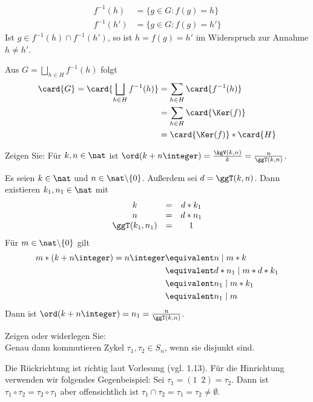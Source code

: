 \begin{uebungsblatt}
\begin{loesung}
\begin{itemize}
		\begin{align*}
			f^{-1}(h) & = \{ g \in G : f(g) = h \} \\
			f^{-1}(h') & = \{ g \in G : f(g) = h' \}
		\end{align*}
		Ist $g \in f^{-1}(h) \cap f^{-1}(h')$, so ist $h = f(g) = h'$ im Widerspruch zur Annahme $h \neq h'$. \par
		Aus $G = \bigsqcup \limits_{h \in H}{f^{-1}(h)}$ folgt 
		\begin{align*}
			\card{G} = \card{\bigsqcup \limits_{h \in H}{f^{-1}(h)}} & = \sum\limits_{h \in H}{\card{f^{-1}(h)}} \\
			& = \sum\limits_{h \in H}{\card{\Ker(f)}} \\
			& = \card{\Ker(f)} * \card{H}
		\end{align*}
	\end{itemize}
\end{loesung}
%
\newpage
%
\begin{uebung}
	Zeigen Sie: Für $k,n \in \nat$ ist $\ord(k+n\integer) = \frac{\kgV(k,n)}{k} = \frac{n}{\ggT(k,n)}$.
\end{uebung}
\begin{loesung}
	Es seien $k \in \nat$ und $n \in \nat \backslash \{0\}$. Außerdem sei $d = \ggT(k,n)$. Dann existieren $k_1, n_1 \in \nat$ mit 
	\begin{align*}
		\begin{matrix}
		k &=& d * k_1 \\ n &=& d * n_1 \\ \ggT(k_1, n_1) &=& 1
		\end{matrix}
	\end{align*}
	Für $m \in \nat \backslash \{ 0 \}$ gilt 
	\begin{align*}
		m * (k + n\integer) = n\integer & \equivalent n \mid  m*k \\
		& \equivalent d * n_1 \mid m * d * k_1 \\
		& \equivalent n_1 \mid m * k_1 \\
		& \equivalent n_1 \mid m
	\end{align*}
	Dann ist $\ord(k + n\integer) = n_1 = \frac{n}{\ggT(k,n)}$.
\end{loesung}
%
\setcounter{taskcount}{16}
%
\begin{uebung} [Präsenz]
	Zeigen oder widerlegen Sie: \\
	Genau dann kommutieren Zykel $\tau_1, \tau_2 \in S_n$, wenn sie disjunkt sind.
\end{uebung}
\begin{loesung}
	Die Rückrichtung ist richtig laut Vorlesung (vgl. 1.13). Für die Hinrichtung verwenden wir folgendes Gegenbeispiel: Sei $\tau_1=(1 \enspace 2) = \tau_2$. Dann ist $\tau_1 \circ \tau_2 = \tau_2 \circ \tau_1$ aber offensichtlich ist $\tau_1 \cap \tau_2 = \tau_1 = \tau_2 \neq \emptyset$.
\end{loesung}


\end{uebungsblatt}

